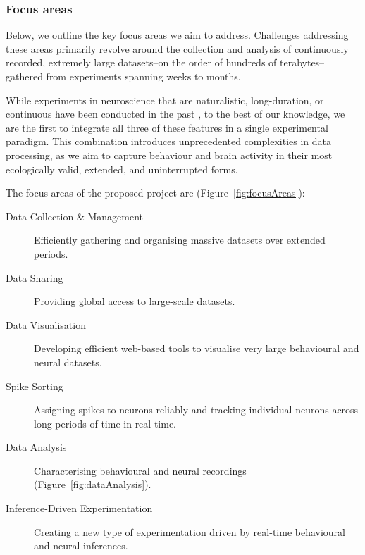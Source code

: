 \subsubsection{Focus areas}

Below, we outline the key focus areas we aim to address.
%
Challenges addressing these areas primarily revolve around the collection
and analysis of continuously recorded, extremely large datasets--on the order
of hundreds of terabytes--gathered from experiments spanning weeks to months.

While experiments in neuroscience that are naturalistic, long-duration, or
continuous have been conducted in the past
\citep[e.g.,][]{jhuangEtAl10,maoEtAl21,volohEtAl23}, to the best of our
knowledge, we are the first to integrate all three of these features in a
single experimental paradigm.
%
This combination introduces unprecedented complexities in data processing, as
we aim to capture behaviour and brain activity in their most ecologically valid,
extended, and uninterrupted forms.

The focus areas of the proposed project are (Figure~\ref{fig:focusAreas}):

\begin{description}

    \item[Data Collection \& Management] Efficiently gathering and organising
        massive datasets over extended periods.

    \item[Data Sharing] Providing global access to large-scale datasets.

    \item[Data Visualisation] Developing efficient web-based tools to visualise
        very large behavioural and neural datasets.

    \item[Spike Sorting] Assigning spikes to neurons reliably and tracking
        individual neurons across long-periods of time in real time.

    \item[Data Analysis] Characterising behavioural and neural recordings
        (Figure~\ref{fig:dataAnalysis}).

    \item[Inference-Driven Experimentation] Creating a new type of
        experimentation driven by real-time behavioural and neural inferences.

\end{description}

